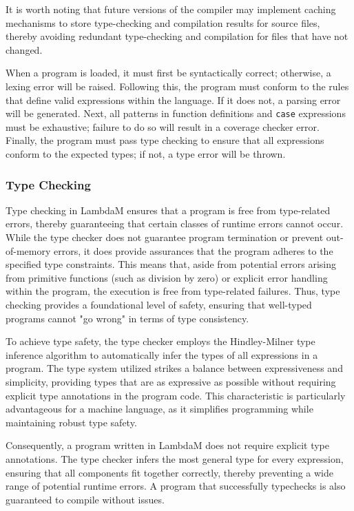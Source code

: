 \documentclass{IEEEtran}
\begin{document}
\par It is worth noting that future versions of the compiler may implement caching mechanisms to store type-checking and compilation results for source files, thereby avoiding redundant type-checking and compilation for files that have not changed.

\par When a program is loaded, it must first be syntactically correct; otherwise, a lexing error will be raised. Following this, the program must conform to the rules that define valid expressions within the language. If it does not, a parsing error will be generated. Next, all patterns in function definitions and \texttt{case} expressions must be exhaustive; failure to do so will result in a coverage checker error. Finally, the program must pass type checking to ensure that all expressions conform to the expected types; if not, a type error will be thrown.

\subsubsection{Type Checking}

\par Type checking in LambdaM ensures that a program is free from type-related errors, thereby guaranteeing that certain classes of runtime errors cannot occur. While the type checker does not guarantee program termination or prevent out-of-memory errors, it does provide assurances that the program adheres to the specified type constraints. This means that, aside from potential errors arising from primitive functions (such as division by zero) or explicit error handling within the program, the execution is free from type-related failures. Thus, type checking provides a foundational level of safety, ensuring that well-typed programs cannot "go wrong" in terms of type consistency.

\par To achieve type safety, the type checker employs the Hindley-Milner type inference algorithm to automatically infer the types of all expressions in a program. The type system utilized strikes a balance between expressiveness and simplicity, providing types that are as expressive as possible without requiring explicit type annotations in the program code. This characteristic is particularly advantageous for a machine language, as it simplifies programming while maintaining robust type safety.

\par Consequently, a program written in LambdaM does not require explicit type annotations. The type checker infers the most general type for every expression, ensuring that all components fit together correctly, thereby preventing a wide range of potential runtime errors. A program that successfully typechecks is also guaranteed to compile without issues.
\end{document}
